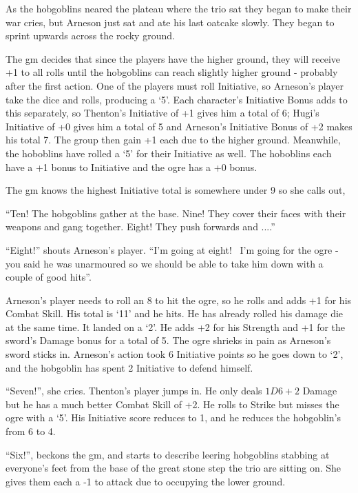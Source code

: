 \documentclass[titlepage,a4paper,openany]{book}
\begin{document}
\begin{multicols}{2}
{\begin{exampletext}
	As the hobgoblins neared the plateau where the trio sat they began to make their war cries, but Arneson just sat and ate his last oatcake slowly. They began to sprint upwards across the rocky ground.

	The \gls{gm} decides that since the players have the higher ground, they will receive +1 to all rolls until the hobgoblins can reach slightly higher ground - probably after the first action.
One of the players must roll Initiative, so Arneson's player take the dice and rolls, producing a `5'.
Each character's Initiative Bonus adds to this separately, so Thenton's Initiative of +1 gives him a total of 6; Hugi's Initiative of +0 gives him a total of 5 and Arneson's Initiative Bonus of +2 makes his total 7.
The group then gain +1 each due to the higher ground.
Meanwhile, the hoboblins have rolled a `5' for their Initiative as well.
The hoboblins each have a +1 bonus to Initiative and the ogre has a +0 bonus.

	The \gls{gm} knows the highest Initiative total is somewhere under 9 so she calls out,

	``Ten! The hobgoblins gather at the base. Nine! They cover their faces with their weapons and gang together. Eight! They push forwards and ....''

	``Eight!'' shouts Arneson's player. ``I'm going at eight! \ I'm going for the ogre - you said he was unarmoured so we should be able to take him down with a couple of good hits''.


	Arneson's player needs to roll an 8 to hit the ogre, so he rolls and adds +1 for his Combat Skill. His total is `11' and he hits. He has already rolled his damage die at the same time. It landed on a `2'. He adds +2 for his Strength and +1 for the sword's Damage bonus for a total of 5. The ogre shrieks in pain as Arneson's sword sticks in. Arneson's action took 6 Initiative points so he goes down to `2', and the hobgoblin has spent 2 Initiative to defend himself.

	``Seven!'', she cries. Thenton's player jumps in. He only deals $1D6+2$ Damage but he has a much better Combat Skill of +2. He rolls to Strike but misses the ogre with a `5'. His Initiative score reduces to 1, and he reduces the hobgoblin's from 6 to 4.

	``Six!'', beckons the \gls{gm}, and starts to describe leering hobgoblins stabbing at everyone's feet from the base of the great stone step the trio are sitting on. She gives them each a -1 to attack due to occupying the lower ground.


\end{exampletext}}
\end{multicols}
\end{document}

